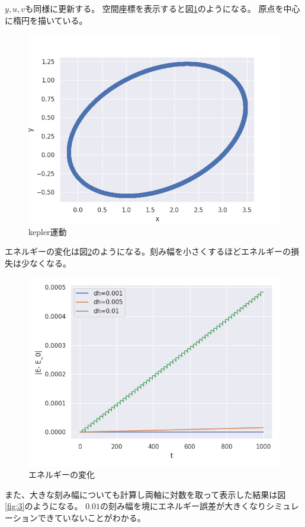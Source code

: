 \documentclass{jsarticle}
\begin{document}
$y,u,v$も同様に更新する。
空間座標を表示すると図\ref{fig:kepler}のようになる。
原点を中心に楕円を描いている。
\begin{figure}[htbp]
    \includegraphics[clip,width=15.0cm]{./kepler.png}
    \caption{kepler運動}
    \label{fig:kepler}
\end{figure}
エネルギーの変化は図\ref{fig:2}のようになる。刻み幅を小さくするほどエネルギーの損失は少なくなる。
\begin{figure}[htbp]
    \includegraphics[clip,width=15.0cm]{./energy.png}
    \caption{エネルギーの変化}
    \label{fig:2}
\end{figure}
また、大きな刻み幅についても計算し両軸に対数を取って表示した結果は図\ref{fig:3}のようになる。
$0.01$の刻み幅を境にエネルギー誤差が大きくなりシミュレーションできていないことがわかる。
\end{document}
